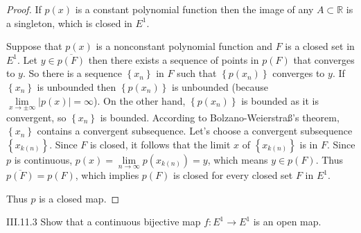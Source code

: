 \begin{proof}
	If \( p(x) \) is a constant polynomial function then the image of any \( A \subset \mathbb{R} \) is a singleton, which is closed in \( E^{1} \).

	Suppose that \( p(x) \) is a nonconstant polynomial function and \( F \) is a closed set in \( E^{1} \). Let \( y \in \overline{p(F)} \) then there exists a sequence of points in \( p(F) \) that converges to \( y \). So there is a sequence \( \left\{ x_{n} \right\} \) in \( F \) such that \( \left\{ p(x_{n}) \right\} \) converges to \( y \). If \( \left\{ x_{n} \right\} \) is unbounded then \( \left\{ p(x_{n}) \right\} \) is unbounded (because \( \lim\limits_{x\to\pm\infty} \left\vert p(x) \right\vert = \infty \)). On the other hand, \( \left\{ p(x_{n}) \right\} \) is bounded as it is convergent, so \( \left\{ x_{n} \right\} \) is bounded. According to Bolzano-Weierstra\ss's theorem, \( \left\{ x_{n} \right\} \) contains a convergent subsequence. Let's choose a convergent subsequence \( \left\{ x_{k(n)} \right\} \). Since \( F \) is closed, it follows that the limit \( x \) of \( \left\{ x_{k(n)} \right\} \) is in \( F \). Since \( p \) is continuous, \( p(x) = \lim\limits_{n\to\infty} p(x_{k(n)}) = y \), which means \( y \in p(F) \). Thus \( \overline{p(F)} = p(F) \), which implies \( p(F) \) is closed for every closed set \( F \) in \( E^{1} \).

	Thus \( p \) is a closed map.
\end{proof}

\begin{problem}{III.11.3}
Show that a continuous bijective map \( f: E^{1} \to E^{1} \) is an open map.
\end{problem}

